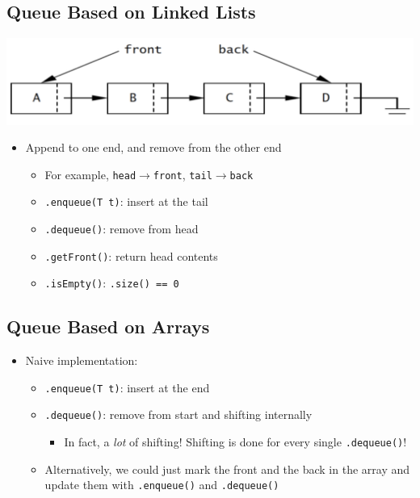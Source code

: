 \documentclass[10pt]{article}
\begin{document}
\subsection*{Queue Based on Linked Lists}
\begin{center}
\includegraphics[width=\textwidth/2]{images/5.png}
\end{center}
\begin{itemize}
    \item Append to one end, and remove from the other end
    \begin{itemize}
        \item For example, \texttt{head}$\to$\texttt{front}, \texttt{tail}$\to$\texttt{back}
        \item \texttt{.enqueue(T t)}: insert at the tail
        \item \texttt{.dequeue()}: remove from head
        \item \texttt{.getFront()}: return head contents
        \item \texttt{.isEmpty()}: \texttt{.size() == 0}
    \end{itemize}
\end{itemize}

\subsection*{Queue Based on Arrays}
\begin{itemize}
    \item Naive implementation:
    \begin{itemize}
        \item \texttt{.enqueue(T t)}: insert at the end
        \item \texttt{.dequeue()}: remove from start and shifting internally
        \begin{itemize}
            \item In fact, a \textit{lot} of shifting! Shifting is done for every single \texttt{.dequeue()}!
        \end{itemize}
        \item Alternatively, we could just mark the front and the back in the array and update them with \texttt{.enqueue()} and \texttt{.dequeue()}
    \end{itemize}
\end{itemize}
\end{document}
